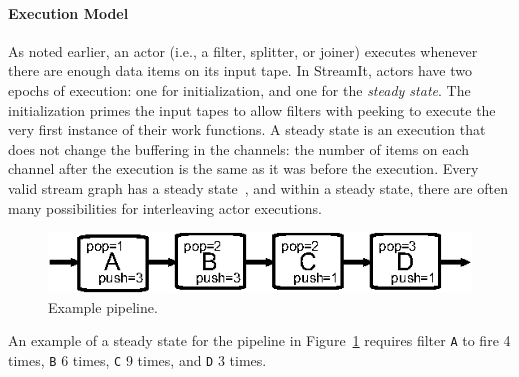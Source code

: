 \documentclass{sigplanconf}
\begin{document}
\paragraph*{Execution Model}
As noted earlier, an actor (i.e., a filter, splitter, or joiner)
executes whenever there are enough data items on its input 
tape. In StreamIt, actors have  two epochs
of execution: one for initialization, and one for the {\it steady
state}. The initialization primes the input tapes to allow filters with
peeking to execute the very first instance of their work functions.
A steady state is an execution that does not change the
buffering in the channels: the number of items on each channel
after the execution is the same as it was before the execution. 
Every valid stream graph has a steady state~\cite{LM87-i}, and within
a steady state, there are often many possibilities for interleaving
actor executions. 
\begin{figure}[t]
\begin{center}
 \includegraphics[scale=1, angle=0]{./pipe-with-rates.eps}
 \caption{Example pipeline.}
 \label{fig:pipe-with-rates}
\end{center}
\end{figure}
An example of a steady state for the pipeline in
Figure~\ref{fig:pipe-with-rates} requires filter \texttt{A} to fire
4 times, \texttt{B} 6 times, \texttt{C} 9 times, and
\texttt{D} 3 times. 
\end{document}

